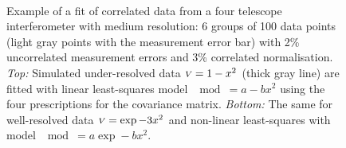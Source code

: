 \documentclass{pasa}
\begin{document}
\begin{figure}
\centering
{}\\
\caption{Example of a fit of correlated data from a four telescope interferometer with medium resolution: 6 groups of 100 data points (light gray points with the measurement error bar) with 2\% uncorrelated measurement errors and 3\% correlated normalisation.  \emph{Top:} Simulated under-resolved data ${\scriptstyle V} = 1-x^2$ (thick gray line) are fitted with linear least-squares model $\mod = a-bx^2$ using the four prescriptions for the covariance matrix. \emph{Bottom:} The same for well-resolved data ${\scriptstyle V} = \exp -3x^2$ and non-linear least-squares with model $\mod = a\exp -bx^2$.}
\end{figure}
\end{document}
